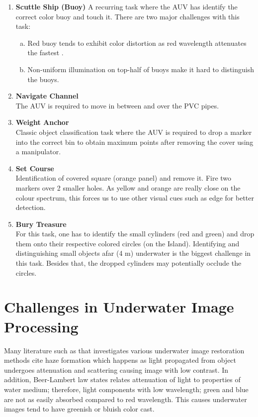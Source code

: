 \documentclass[hyp]{socreport}
\begin{document}
\begin{enumerate}
    \item \textbf{Scuttle Ship (Buoy)}
        A recurring task where the AUV has identify the correct color
        buoy and touch it. There are two major challenges with this
        task:
        \begin{enumerate}[a.]
        \item Red buoy tends to exhibit color distortion as red
          wavelength attenuates the fastest \cite{Galdran2015}.
        \item Non-uniform illumination on top-half of buoys make it hard
          to distinguish the buoys.
        \end{enumerate}
    \item \textbf{Navigate Channel} \\
        The AUV is required to move in between and over the PVC pipes.
    \item \textbf{Weight Anchor} \\
        Classic object classification task where the AUV is required to
        drop a marker into the correct bin to obtain maximum points
        after removing the cover using a manipulator.
    \item \textbf{Set Course} \\
        Identification of covered square (orange panel) and remove it.
        Fire two markers over 2 smaller holes. As yellow and orange are
        really close on the colour spectrum, this forces us to use other
        visual cues such as edge for better detection.
    \item \textbf{Bury Treasure} \\
        For this task, one has to identify the small cylinders (red and
        green) and drop them onto their respective colored circles (on
        the Island). Identifying and distinguishing small objects afar
        (4 m) underwater is the biggest challenge in this task. Besides
        that, the dropped cylinders may potentially occlude the circles.
\end{enumerate}

\section{Challenges in Underwater Image Processing}

Many literature such as  that investigates various
underwater image restoration methods cite haze formation which happens
as light propagated from object undergoes attenuation and scattering
causing image with low contrast. In addition, Beer-Lambert law
\cite{gevers2012color} states relates attenuation of light to properties
of water medium; therefore, light components with low wavelength; green
and blue are not as easily absorbed compared to red wavelength. This
causes underwater images tend to have greenish or bluish color cast.
\end{document}

